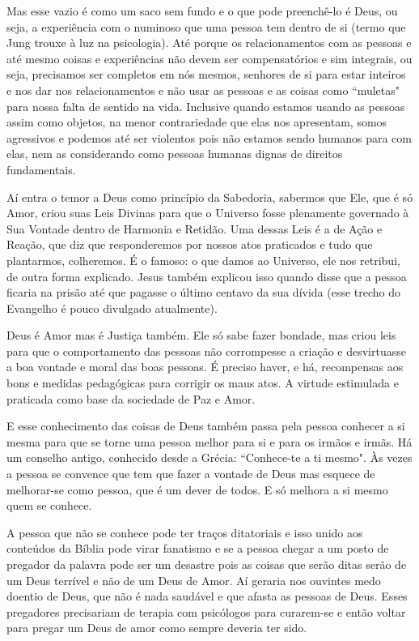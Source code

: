\emdash{}Mas esse vazio é como um saco sem fundo e o que pode preenchê-lo é Deus, ou seja, a experiência com o numinoso que uma pessoa tem dentro de si (termo que Jung trouxe à luz na psicologia). Até porque os relacionamentos com as pessoas e até mesmo coisas e experiências não devem ser compensatórios e sim integrais, ou seja, precisamos ser completos em nós mesmos, senhores de si para estar inteiros e nos dar nos relacionamentos e não usar as pessoas e as coisas como ``muletas" para nossa falta de sentido na vida. Inclusive quando estamos usando as pessoas assim como objetos, na menor contrariedade que elas nos apresentam, somos agressivos e podemos até ser violentos pois não estamos sendo humanos para com elas, nem as considerando como pessoas humanas dignas de direitos fundamentais.

\emdash{}Aí entra o temor a Deus como princípio da Sabedoria, sabermos que Ele, que é só Amor, criou suas Leis Divinas para que o Universo fosse plenamente governado à Sua Vontade dentro de Harmonia e Retidão. Uma dessas Leis é a de Ação e Reação, que diz que responderemos por nossos atos praticados e tudo que plantarmos, colheremos. É o famoso: o que damos ao Universo, ele nos retribui, de outra forma explicado. Jesus também explicou isso quando disse que a pessoa ficaria na prisão até que pagasse o último centavo da sua dívida (esse trecho do Evangelho é pouco divulgado atualmente).

\emdash{}Deus é Amor mas é Justiça também. Ele só sabe fazer bondade, mas criou leis para que o comportamento das pessoas não corrompesse a criação e desvirtuasse a boa vontade e moral das boas pessoas. É preciso haver, e há, recompensas aos bons e medidas pedagógicas para corrigir os maus atos. A virtude estimulada e praticada como base da sociedade de Paz e Amor. 

\emdash{}E esse conhecimento das coisas de Deus também passa pela pessoa conhecer a si mesma para que se torne uma pessoa melhor para si e para os irmãos e irmãs. Há um conselho antigo, conhecido desde a Grécia: ``Conhece-te a ti mesmo". Às vezes a pessoa se convence que tem que fazer a vontade de Deus mas esquece de melhorar-se como pessoa, que é um dever de todos. E só melhora a si mesmo quem se conhece.

\emdash{}A pessoa que não se conhece pode ter traços ditatoriais e isso unido aos conteúdos da Bíblia pode virar fanatismo e se a pessoa chegar a um posto de pregador da palavra pode ser um desastre pois as coisas que serão ditas serão de um Deus terrível e não de um Deus de Amor. Aí geraria nos ouvintes medo doentio de Deus, que não é nada saudável e que afasta as pessoas de Deus. Esses pregadores precisariam de terapia com psicólogos para curarem-se e então voltar para pregar um Deus de amor como sempre deveria ter sido.